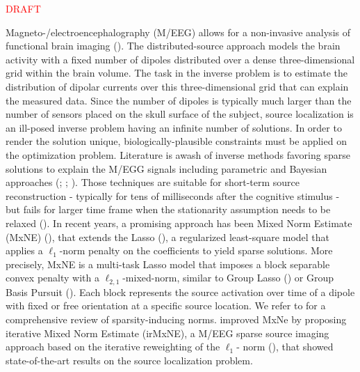 \textcolor{red}{DRAFT}

Magneto-/electroencephalography (M/EEG) allows for a non-invasive analysis of
functional brain imaging (\cite{Baillet_Mosher_Leahy_2001}). The distributed-source approach models the brain activity
with a fixed number of dipoles distributed over a dense three-dimensional 
grid within the brain volume. The task in the inverse problem is to estimate the 
distribution of dipolar currents over this three-dimensional grid that can explain the 
measured data. Since the number of dipoles is typically much larger than the number 
of sensors placed on the skull surface of the subject, source localization is an 
ill-posed inverse problem having an infinite number of solutions. In order to render
the solution unique, biologically-plausible constraints must be applied on the optimization
problem. Literature is awash of inverse methods favoring sparse solutions to explain the
M/EGG signals including parametric and Bayesian approaches (\cite{Huang_Breheny_Ma_2012};
\cite{Matsuura_Okabe_1995}; \cite{Uutela_Hamalainen_Somersalo_1999}). 
Those techniques are suitable for short-term source reconstruction - typically for tens 
of milliseconds after the cognitive stimulus - but fails for larger time frame when the 
stationarity assumption needs to be relaxed (\cite{Gramfort_Strohmeier_Haueisen_Hamalainen_Kowalski13}). 
In recent years, a promising approach has been Mixed Norm Estimate (MxNE) 
(\cite{Gramfort_Kowalski_Hamalainen12}), that extends the Lasso (\cite{Tibshirani96}), 
a regularized least-square model that applies a $\ell_1$-norm penalty on the coefficients to yield 
sparse solutions. More precisely, MxNE is a multi-task Lasso
model that imposes a block separable convex penalty with a $\ell_{2,1}$-mixed-norm, similar to 
Group Lasso (\cite{Yuan_Lin06}) or Group Basis Pursuit (\cite{Liao_Li_Carin_2014}). Each block represents the source
activation over time of a dipole with fixed or free orientation at a specific source location.
We refer to \cite{Bach_Jenatton_Mairal_Obozinski12} for a comprehensive review of sparsity-inducing
norms. \cite{Strohmeier_Bekhti_Haueisen_Gramfort_2016} improved MxNe by proposing iterative Mixed Norm Estimate 
(irMxNE), a M/EEG sparse source imaging approach based on the iterative reweighting of the $\ell_1$-
norm (\cite{Candes_Wakin_Boyd08}), that showed state-of-the-art results on the source localization
problem.

